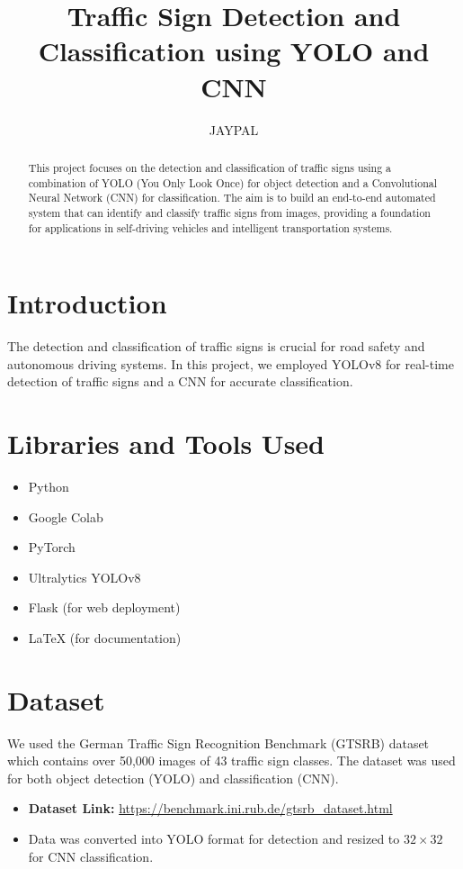 \documentclass[12pt]{article}
\title{Traffic Sign Detection and Classification using YOLO and CNN}
\author{JAYPAL }
\begin{document}
\maketitle

\begin{abstract}
This project focuses on the detection and classification of traffic signs using a combination of YOLO (You Only Look Once) for object detection and a Convolutional Neural Network (CNN) for classification. The aim is to build an end-to-end automated system that can identify and classify traffic signs from images, providing a foundation for applications in self-driving vehicles and intelligent transportation systems.
\end{abstract}

\section{Introduction}
The detection and classification of traffic signs is crucial for road safety and autonomous driving systems. In this project, we employed YOLOv8 for real-time detection of traffic signs and a CNN for accurate classification.

\section{Libraries and Tools Used}
\begin{itemize}
    \item Python
    \item Google Colab
    \item PyTorch
    \item Ultralytics YOLOv8
    \item Flask (for web deployment)
    \item LaTeX (for documentation)
\end{itemize}

\section{Dataset}
We used the German Traffic Sign Recognition Benchmark (GTSRB) dataset which contains over 50,000 images of 43 traffic sign classes. The dataset was used for both object detection (YOLO) and classification (CNN).

\begin{itemize}
    \item \textbf{Dataset Link:} \url{https://benchmark.ini.rub.de/gtsrb_dataset.html}
    \item Data was converted into YOLO format for detection and resized to $32 \times 32$ for CNN classification.
\end{itemize}
\end{document}
